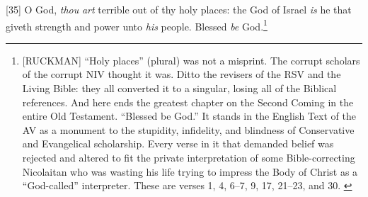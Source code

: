[35] \textcolor[rgb]{0.00,0.00,1.00}{O God, \emph{thou} \emph{art} terrible out of thy holy places: the God of Israel \emph{is} he that giveth strength and power unto \emph{his} people. Blessed \emph{be} God.}\footnote{[RUCKMAN] “Holy places” (plural) was not a misprint. The corrupt scholars of the corrupt NIV thought it was. Ditto the revisers of the RSV and the Living Bible: they all converted it to a singular, losing all of the Biblical references. And here ends the greatest chapter on the Second Coming in the entire Old Testament. “Blessed be God.” It stands in the English Text of the AV as a monument to the stupidity, infidelity, and blindness of Conservative and Evangelical scholarship. Every verse in it that demanded belief was rejected and altered to fit the private interpretation of some Bible-correcting Nicolaitan who was wasting his life trying to impress the Body of Christ as a “God-called” interpreter. These are verses 1, 4, 6--7, 9, 17, 21--23, and 30.  \cite{Ruckman1992Psalms}  }

